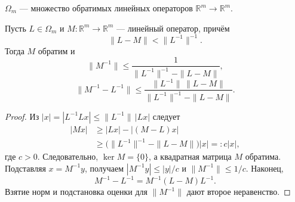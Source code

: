 \label{ticket:07}

\begin{definition}
$\Omega_m$ --- множество обратимых линейных операторов $\mathbb R^m\to\mathbb R^m$.
\end{definition}

\begin{theorem}
Пусть $L\in\Omega_m$ и $M:\mathbb R^m\to\mathbb R^m$ --- линейный оператор, причём
\[
  \|L-M\|<\|L^{-1}\|^{-1}.
\]
Тогда $M$ обратим и
\[
  \|M^{-1}\|\le\frac1{\|L^{-1}\|^{-1}-\|L-M\|},
\]
\[
  \|M^{-1}-L^{-1}\|
  \le\frac{\|L^{-1}\|\,\|L-M\|}{\|L^{-1}\|^{-1}-\|L-M\|}.
\]
\end{theorem}

\begin{proof}
Из $|x|=|L^{-1}Lx|\le\|L^{-1}\|\,|Lx|$ следует
\[
  \begin{aligned}
  |Mx|&\ge|Lx|-|(M-L)x|\\
      &\ge\bigl(\|L^{-1}\|^{-1}-\|L-M\|\bigr)|x|=:c|x|,
  \end{aligned}
\]
где $c>0$.
Следовательно, $\ker M=\{0\}$, а квадратная матрица $M$ обратима.
Подставляя $x=M^{-1}y$, получаем $|M^{-1}y|\le|y|/c$ и $\|M^{-1}\|\le1/c$.
Наконец,
\[
  M^{-1}-L^{-1}=M^{-1}(L-M)L^{-1}.
\]
Взятие норм и подстановка оценки для $\|M^{-1}\|$ дают второе неравенство.
\end{proof}
